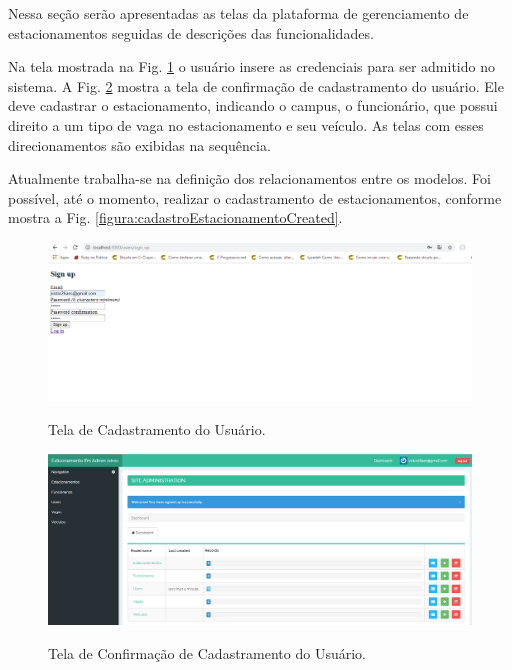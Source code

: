  
 Nessa seção serão apresentadas as telas da plataforma de gerenciamento de estacionamentos seguidas de descrições das funcionalidades.
 
 Na tela mostrada na Fig. \ref{figura:signUp_projetoTCC} o usuário insere as credenciais para ser admitido no
 sistema. A Fig. \ref{figura:signedUpSuccessfully} mostra a tela de confirmação de cadastramento do usuário. Ele deve cadastrar o estacionamento, indicando o campus, o funcionário, que possui direito a um tipo de vaga no estacionamento e seu veículo. As telas com esses direcionamentos são exibidas na sequência.
 
 
 Atualmente trabalha-se na definição dos relacionamentos entre os modelos. Foi possível, até o momento, realizar o cadastramento de estacionamentos, conforme mostra a Fig. \ref{figura:cadastroEstacionamentoCreated}.
  
  
  
 
  
  
 \begin{figure}[h]
	\caption{Tela de Cadastramento do Usuário.}
	
	\centering %
	\includegraphics[scale=0.45]{Figs/signUp_projetoTCC.png} %
	\label{figura:signUp_projetoTCC}
\end{figure}

\begin{figure}[h]
	\caption{Tela de Confirmação de Cadastramento do Usuário.}
	
	\centering %
	\includegraphics[scale=0.45]{Figs/signedUpSuccessfully.png} %
	\label{figura:signedUpSuccessfully}
\end{figure}

